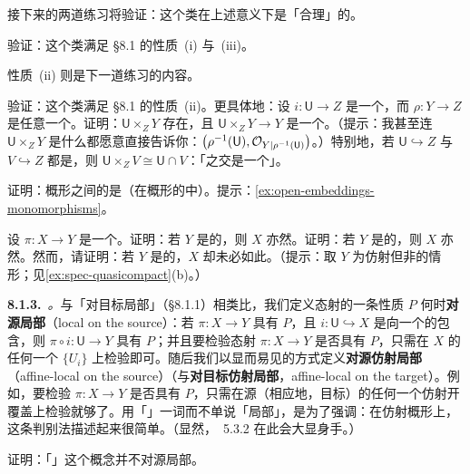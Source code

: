 接下来的两道练习将验证：\trOpenEmbedding{}这个类在上述意义下是「合理」的。

\begin{exercise}\label{ex:open-embeddings-composition-local}
验证：\trOpenEmbedding{}这个类满足 \S8.1 的性质~(i) 与~(iii)。
\end{exercise}

性质~(ii) 则是下一道练习的内容。

\begin{exercise}\label{ex:open-embeddings-base-change}
验证：\trOpenEmbedding{}这个类满足 \S8.1 的性质~(ii)。更具体地：设 $i\colon\mathsf{U}\to Z$ 是一个\trOpenEmbedding，而 $\rho\colon Y\to Z$ 是任意一个\trMorphism。证明：$\mathsf{U}\times_Z Y$ 存在，且 $\mathsf{U}\times_Z Y\to Y$ 是一个\trOpenEmbedding。（提示：我甚至连 $\mathsf{U}\times_Z Y$ 是什么都愿意直接告诉你：$\bigl(\rho^{-1}(\mathsf{U}),\mathcal{O}_{Y|\rho^{-1}(\mathsf{U})}\bigr)$。）特别地，若 $\mathsf{U}\hookrightarrow Z$ 与 $V\hookrightarrow Z$ 都是\trOpenEmbedding，则 $\mathsf{U}\times_Z V\cong\mathsf{U}\cap V$：「\trOpenEmbedding{}之交是一个\trFiberProduct」。
\end{exercise}

\begin{exercise}[容易的练习]\label{ex:open-embeddings-are-monomorphisms}
证明：概形之间的\trOpenEmbedding{}是\trMonomorphism{}（在概形的\trCategory{}中）。提示：\cref{ex:open-embeddings-monomorphisms}。
\end{exercise}

\begin{exercise}[容易的练习]\label{ex:open-embeddings-noetherian-quasicompact}
设 $\pi\colon X\to Y$ 是一个\trOpenEmbedding。证明：若 $Y$ 是\trLocally\trNoetherian{}的，则 $X$ 亦然。证明：若 $Y$ 是\trNoetherian{}的，则 $X$ 亦然。然而，请证明：若 $Y$ 是\trQuasicompact{}的，$X$ 却未必如此。（提示：取 $Y$ 为仿射但非\trNoetherian{}的情形；见\cref{ex:spec-quasicompact}(b)。）
\end{exercise}

\textbf{8.1.3.}\ \emph{\trhDefinition{}。}\quad 与「对目标局部」（\S8.1.1）相类比，我们定义态射的一条性质 $P$ 何时\textbf{对源局部}（local on the source）：若 $\pi\colon X\to Y$ 具有 $P$，且 $i\colon\mathsf{U}\hookrightarrow X$ 是向一个\trOpenSubset{}的包含，则 $\pi\circ i\colon\mathsf{U}\to Y$ 具有 $P$；并且要检验态射 $\pi\colon X\to Y$ 是否具有 $P$，只需在 $X$ 的任何一个\trOpenCover{} $\{U_i\}$ 上检验即可。随后我们以显而易见的方式定义\textbf{对源仿射局部}（affine-local on the source）（与\textbf{对目标仿射局部}，affine-local on the target）。例如，要检验 $\pi\colon X\to Y$ 是否具有 $P$，只需在源（相应地，目标）的任何一个仿射开覆盖上检验就够了。用「\trAffineLocal」一词而不单说「局部」，是为了强调：在仿射概形上，这条判别法描述起来很简单。（显然，\trAffineCommunicationLemma{}~5.3.2 在此会大显身手。）

\begin{exercise}[概念演练]\label{ex:open-embedding-not-source-local}
证明：「\trOpenEmbedding」这个概念并不对源局部。
\end{exercise}
